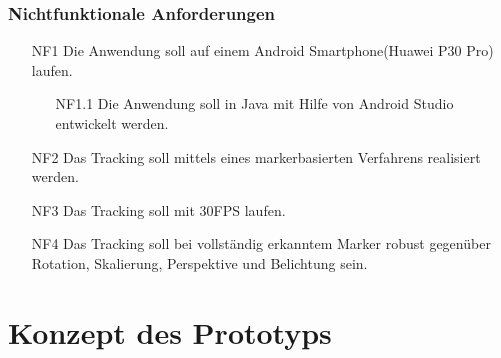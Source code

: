 \subsubsection{Nichtfunktionale Anforderungen}
\begin{itemize}
\item[NF1] Die Anwendung soll auf einem Android Smartphone(Huawei P30 Pro) laufen.
\begin{enumerate}
\item[NF1.1] Die Anwendung soll in Java mit Hilfe von Android Studio entwickelt werden.
\end{enumerate}

\item[NF2] Das Tracking soll mittels eines markerbasierten Verfahrens realisiert werden.
\item[NF3] Das Tracking soll mit 30FPS laufen.
\item[NF4] Das Tracking soll bei vollständig erkanntem Marker robust gegenüber Rotation, Skalierung, Perspektive und Belichtung sein.

\end{itemize}
\section{Konzept des Prototyps}



